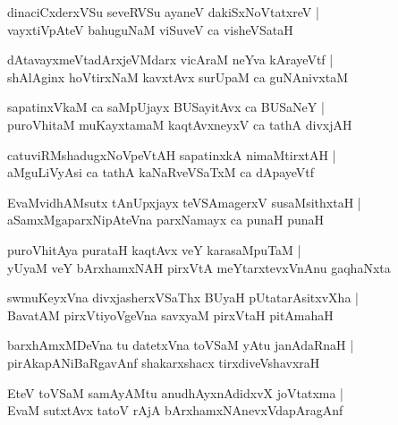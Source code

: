\begin{shloka}
dinaciCxderxVSu seveRVSu ayaneV dakiSxNoVtatxreV |\\
vayxtiVpAteV bahuguNaM viSuveV ca visheVSataH 
\end{shloka}

\begin{shloka}
dAtavayxmeVtadArxjeVMdarx vicAraM neYva kArayeVtf |\\
shAlAginx hoVtirxNaM kavxtAvx surUpaM ca guNAnivxtaM 
\end{shloka}

\begin{shloka}
sapatinxVkaM ca saMpUjayx BUSayitAvx ca BUSaNeY |\\
puroVhitaM muKayxtamaM kaqtAvxneyxV ca tathA divxjAH
\end{shloka}

\begin{shloka}
catuviRMshadugxNoVpeVtAH sapatinxkA nimaMtirxtAH |\\
aMguLiVyAsi ca tathA kaNaRveVSaTxM ca dApayeVtf 
\end{shloka}

\begin{shloka}
EvaMvidhAMsutx tAnUpxjayx teVSAmagerxV susaMsithxtaH |\\
aSamxMgaparxNipAteVna parxNamayx ca punaH punaH 
\end{shloka}

\begin{shloka}
puroVhitAya purataH kaqtAvx veY karasaMpuTaM |\\
yUyaM veY bArxhamxNAH pirxVtA meYtarxtevxVnAnu gaqhaNxta
\end{shloka}

\begin{shloka}
swmuKeyxVna divxjasherxVSaThx BUyaH pUtatarAsitxvXha |\\
BavatAM pirxVtiyoVgeVna savxyaM pirxVtaH pitAmahaH 
\end{shloka}

\begin{shloka}
barxhAmxMDeVna tu datetxVna toVSaM yAtu janAdaRnaH |\\
pirAkapANiBaRgavAnf shakarxshacx tirxdiveVshavxraH 
\end{shloka}

\begin{shloka}
EteV toVSaM samAyAMtu anudhAyxnAdidxvX joVtatxma |\\
EvaM sutxtAvx tatoV rAjA bArxhamxNAnevxVdapAragAnf 
\end{shloka}

